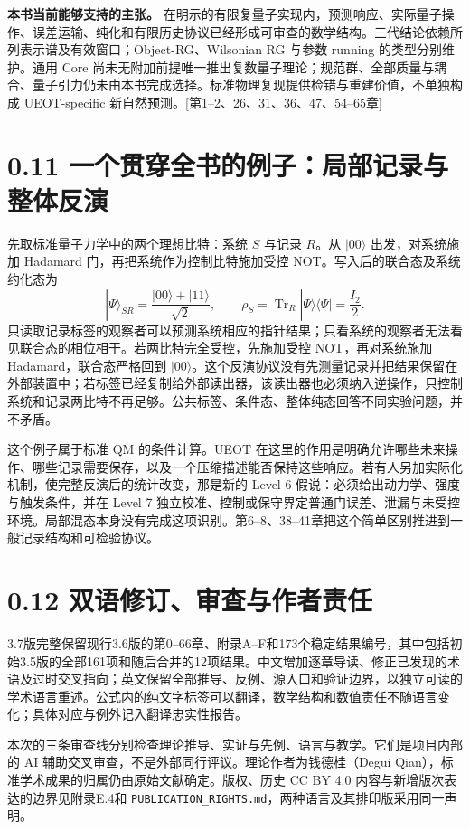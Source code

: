 \documentclass[
  11pt,
  oneside]{book}
\begin{document}
\textbf{本书当前能够支持的主张。}
在明示的有限复量子实现内，预测响应、实际量子操作、误差运输、纯化和有限历史协议已经形成可审查的数学结构。三代结论依赖所列表示谱及有效窗口；Object-RG、Wilsonian
RG 与参数 running 的类型分别维护。通用 Core
尚未无附加前提唯一推出复数量子理论；规范群、全部质量与耦合、量子引力仍未由本书完成选择。标准物理复现提供检错与重建价值，不单独构成
UEOT-specific 新自然预测。{[}第1--2、26、31、36、47、54--65章{]}

\section{0.11 一个贯穿全书的例子：局部记录与整体反演}

先取标准量子力学中的两个理想比特：系统 \(S\) 与记录 \(R\)。从
\(|00\rangle\) 出发，对系统施加 Hadamard
门，再把系统作为控制比特施加受控 NOT。写入后的联合态及系统约化态为 \[
|\Psi\rangle_{SR}=\frac{|00\rangle+|11\rangle}{\sqrt2},
\qquad
\rho_S=\operatorname{Tr}_R|\Psi\rangle\langle\Psi|=\frac{I_2}{2}.
\]
只读取记录标签的观察者可以预测系统相应的指针结果；只看系统的观察者无法看见联合态的相位相干。若两比特完全受控，先施加受控
NOT，再对系统施加 Hadamard，联合态严格回到
\(|00\rangle\)。这个反演协议没有先测量记录并把结果保留在外部装置中；若标签已经复制给外部读出器，该读出器也必须纳入逆操作，只控制系统和记录两比特不再足够。公共标签、条件态、整体纯态回答不同实验问题，并不矛盾。

这个例子属于标准 QM 的条件计算。UEOT
在这里的作用是明确允许哪些未来操作、哪些记录需要保存，以及一个压缩描述能否保持这些响应。若有人另加实际化机制，使完整反演后的统计改变，那是新的
Level 6 假说：必须给出动力学、强度与触发条件，并在 Level 7
独立校准、控制或保守界定普通门误差、泄漏与未受控环境。局部混态本身没有完成这项识别。第6--8、38--41章把这个简单区别推进到一般记录结构和可检验协议。

\section{0.12 双语修订、审查与作者责任}

3.7版完整保留现行3.6版的第0--66章、附录A--F和173个稳定结果编号，其中包括初始3.5版的全部161项和随后合并的12项结果。中文增加逐章导读、修正已发现的术语及过时交叉指向；英文保留全部推导、反例、源入口和验证边界，以独立可读的学术语言重述。公式内的纯文字标签可以翻译，数学结构和数值责任不随语言变化；具体对应与例外记入翻译忠实性报告。

本次的三条审查线分别检查理论推导、实证与先例、语言与教学。它们是项目内部的
AI 辅助交叉审查，不是外部同行评议。理论作者为钱德桂（Degui
Qian），标准学术成果的归属仍由原始文献确定。版权、历史 CC BY 4.0
内容与新增版次表达的边界见附录E.4和
\texttt{PUBLICATION\_\allowbreak RIGHTS.\allowbreak md}，两种语言及其排印版采用同一声明。
\end{document}
